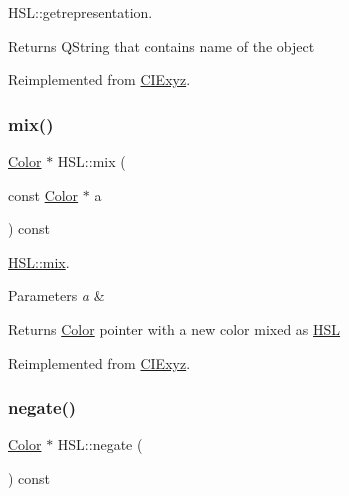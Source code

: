 H\+S\+L\+::getrepresentation. 

\begin{DoxyReturn}{Returns}
Q\+String that contains name of the object 
\end{DoxyReturn}


Reimplemented from \hyperlink{class_c_i_exyz_a19120c15d1304696909d76fae6065ebd}{C\+I\+Exyz}.

\mbox{\label{class_h_s_l_a08bcec2ca6961b7c6431d92a625c30a7}} 
\subsubsection{\texorpdfstring{mix()}{mix()}}
{\footnotesize\ttfamily \hyperlink{class_color}{Color} $\ast$ H\+S\+L\+::mix (\begin{DoxyParamCaption}\item[{const \hyperlink{class_color}{Color} $\ast$}]{a }\end{DoxyParamCaption}) const\hspace{0.3cm}{\ttfamily [virtual]}}



\hyperlink{class_h_s_l_a08bcec2ca6961b7c6431d92a625c30a7}{H\+S\+L\+::mix}. 


\begin{DoxyParams}{Parameters}
{\em a} & \\
\hline
\end{DoxyParams}
\begin{DoxyReturn}{Returns}
\hyperlink{class_color}{Color} pointer with a new color mixed as \hyperlink{class_h_s_l}{H\+SL} 
\end{DoxyReturn}


Reimplemented from \hyperlink{class_c_i_exyz_af8eeb48ade44beea43d023b36d263fc8}{C\+I\+Exyz}.

\mbox{\label{class_h_s_l_af681f885d11220b0588e8f969aa95e32}} 
\subsubsection{\texorpdfstring{negate()}{negate()}}
{\footnotesize\ttfamily \hyperlink{class_color}{Color} $\ast$ H\+S\+L\+::negate (\begin{DoxyParamCaption}{ }\end{DoxyParamCaption}) const\hspace{0.3cm}{\ttfamily [virtual]}}



